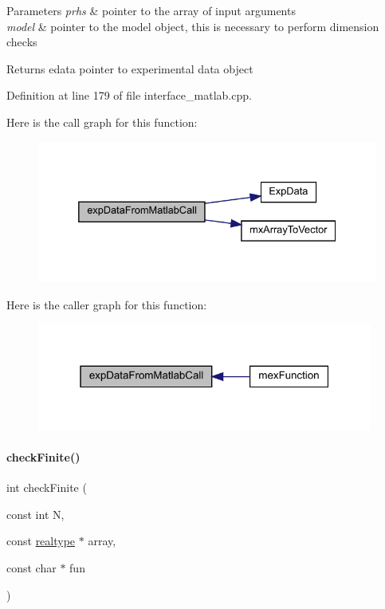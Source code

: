 \begin{DoxyParams}{Parameters}
{\em prhs} & pointer to the array of input arguments \\
\hline
{\em model} & pointer to the model object, this is necessary to perform dimension checks \\
\hline
\end{DoxyParams}
\begin{DoxyReturn}{Returns}
edata pointer to experimental data object 
\end{DoxyReturn}


Definition at line 179 of file interface\+\_\+matlab.\+cpp.

Here is the call graph for this function\+:
\nopagebreak
\begin{figure}[H]
\begin{center}
\leavevmode
\includegraphics[width=332pt]{namespaceamici_a186dd3debfe185669f305464f161e4bb_cgraph}
\end{center}
\end{figure}
Here is the caller graph for this function\+:
\nopagebreak
\begin{figure}[H]
\begin{center}
\leavevmode
\includegraphics[width=313pt]{namespaceamici_a186dd3debfe185669f305464f161e4bb_icgraph}
\end{center}
\end{figure}
\mbox{\label{namespaceamici_aeb0886d5a74ea04eeef52219063aa7d4}} 
\paragraph{\texorpdfstring{check\+Finite()}{checkFinite()}}
{\footnotesize\ttfamily int check\+Finite (\begin{DoxyParamCaption}\item[{const int}]{N,  }\item[{const \mbox{\hyperlink{namespaceamici_a1bdce28051d6a53868f7ccbf5f2c14a3}{realtype}} $\ast$}]{array,  }\item[{const char $\ast$}]{fun }\end{DoxyParamCaption})}

